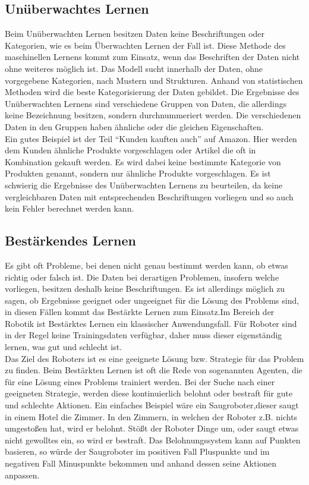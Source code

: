 \subsection{Unüberwachtes Lernen}
\label{sec:UnüberwachtesLernen}
Beim Unüberwachten Lernen besitzen Daten keine Beschriftungen oder Kategorien, wie es beim Überwachten Lernen der Fall ist. Diese Methode des maschinellen Lernens kommt zum Einsatz, wenn das Beschriften der Daten nicht ohne weiteres möglich ist. Das \gls{Modell} sucht innerhalb der Daten, ohne vorgegebene Kategorien, nach Mustern und Strukturen. Anhand von statistischen Methoden wird die beste Kategorisierung der Daten gebildet. Die Ergebnisse des Unüberwachten Lernens sind verschiedene Gruppen von Daten, die allerdings keine Bezeichnung besitzen, sondern durchnummeriert werden. Die verschiedenen Daten in den Gruppen haben ähnliche oder die gleichen Eigenschaften.\\
Ein gutes Beispiel ist der Teil ``Kunden kauften auch'' auf Amazon. Hier werden dem Kunden ähnliche Produkte vorgeschlagen oder Artikel die oft in Kombination gekauft werden. Es wird dabei keine bestimmte Kategorie von Produkten genannt, sondern nur ähnliche Produkte vorgeschlagen. Es ist schwierig die Ergebnisse des Unüberwachten Lernens zu beurteilen, da keine vergleichbaren Daten mit entsprechenden Beschriftungen vorliegen und so auch kein Fehler berechnet werden kann.\cite[vgl.][]{Lang2023,Frochte2020}


\subsection{Bestärkendes Lernen}
\label{sec:BestärkendesLernen}
Es gibt oft Probleme, bei denen nicht genau bestimmt werden kann, ob etwas richtig oder falsch ist. Die Daten bei derartigen Problemen, insofern welche vorliegen, besitzen deshalb keine Beschriftungen. Es ist allerdings möglich zu sagen, ob Ergebnisse geeignet oder ungeeignet für die Lösung des Problems sind, in diesen Fällen kommt das Bestärkte Lernen zum Einsatz.Im Bereich der Robotik ist Bestärktes Lernen ein klassischer Anwendungsfall. Für Roboter sind in der Regel keine Trainingsdaten verfügbar, daher muss dieser eigenständig lernen, was gut und schlecht ist. \cite[vgl.][]{Ertel2021} \\
Das Ziel des Roboters ist es eine geeignete Lösung bzw. Strategie für das Problem zu finden. Beim Bestärkten Lernen ist oft die Rede von sogenannten Agenten, die für eine Lösung eines Problems trainiert werden. Bei der Suche nach einer geeigneten Strategie, werden diese kontinuierlich belohnt oder bestraft für gute und schlechte Aktionen. Ein einfaches Beispiel wäre ein Saugroboter,dieser saugt in einem Hotel die Zimmer. In den Zimmern, in welchen der Roboter z.B. nichts umgestoßen hat, wird er belohnt. Stößt der Roboter Dinge um, oder saugt etwas nicht gewolltes ein, so wird er bestraft. \cite[vgl.][]{Frochte2020} Das Belohnungssystem kann auf Punkten basieren, so würde der Saugroboter im positiven Fall Pluspunkte und im negativen Fall Minuspunkte bekommen und anhand dessen seine Aktionen anpassen.

